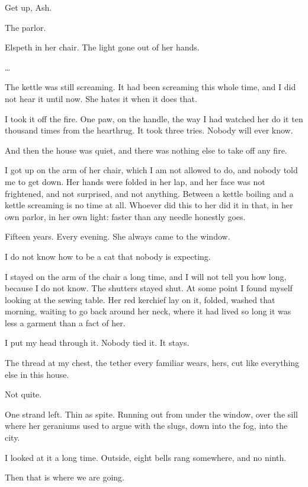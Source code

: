 Get up, Ash.

The parlor.

Elspeth in her chair. The light gone out of her hands.

\begin{center}\ldots\end{center}

The kettle was still screaming. It had been screaming this whole time, and I did not hear it until now. She hates it when it does that.

I took it off the fire. One paw, on the handle, the way I had watched her do it ten thousand times from the hearthrug. It took three tries. Nobody will ever know.

And then the house was quiet, and there was nothing else to take off any fire.

I got up on the arm of her chair, which I am not allowed to do, and nobody told me to get down. Her hands were folded in her lap, and her face was not frightened, and not surprised, and not anything. Between a kettle boiling and a kettle screaming is no time at all. Whoever did this to her did it in that, in her own parlor, in her own light: faster than any needle honestly goes.

Fifteen years. Every evening. She always came to the window.

I do not know how to be a cat that nobody is expecting.

I stayed on the arm of the chair a long time, and I will not tell you how long, because I do not know. The shutters stayed shut. At some point I found myself looking at the sewing table. Her red kerchief lay on it, folded, washed that morning, waiting to go back around her neck, where it had lived so long it was less a garment than a fact of her.

I put my head through it. Nobody tied it. It stays.

The thread at my chest, the tether every familiar wears, hers, cut like everything else in this house.

Not quite.

One strand left. Thin as spite. Running out from under the window, over the sill where her geraniums used to argue with the slugs, down into the fog, into the city.

I looked at it a long time. Outside, eight bells rang somewhere, and no ninth.

Then that is where we are going.
